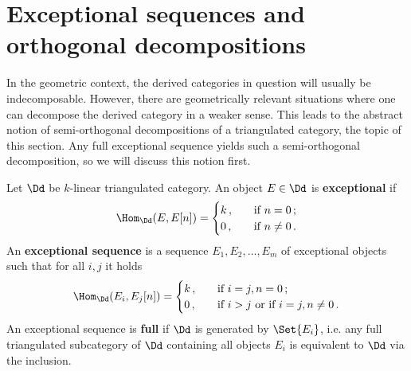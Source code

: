 
\section{Exceptional sequences and orthogonal decompositions}

In the geometric context, the derived categories 
in question will usually be indecomposable. 
However, there are geometrically relevant situations 
where one can decompose the derived category in a weaker sense. 
This leads to the abstract notion of 
semi-orthogonal decompositions 
of a triangulated category, 
the topic of this section. 
Any full exceptional sequence yields such 
a semi-orthogonal decomposition, 
so we will discuss this notion first.

\begin{df}
    Let $\Dd$ be $k$-linear triangulated category. 
    An object $E \in \Dd$ is \textbf{exceptional} if
    \begin{equation*}
        \Hom_{\Dd}(E,E[n]) =
        \begin{cases}
            k\,, \quad &\text{if } n=0\,;\\
            0\,, \quad &\text{if } n \ne 0\,.
        \end{cases}
    \end{equation*}
    An \textbf{exceptional sequence} is a sequence
    $E_{1}, E_{2}, \dots, E_{m}$ of exceptional objects
    such that for all $i,j$ it holds
    \begin{equation*}
        \Hom_{\Dd}(E_{i},E_{j}[n]) =
        \begin{cases}
            k\,, \quad &\text{if } i=j, n=0\,;\\
            0\,, \quad &\text{if } i>j \text{ or if } i = j, n\ne 0\,.
        \end{cases}
    \end{equation*}
    An exceptional sequence is \textbf{full} if $\Dd$
    is generated by $\Set{E_{i}}$, 
    i.e. any full triangulated subcategory of $\Dd$
    containing all objects $E_{i}$ is equivalent to $\Dd$
    via the inclusion.
\end{df}

